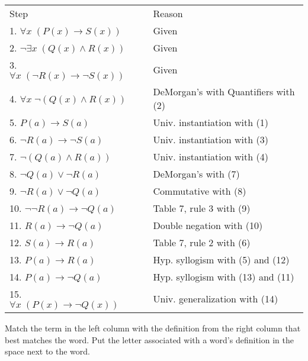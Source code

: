 \documentclass[12pt,addpoints]{exam}
\newcommand{\ra}{\rightarrow}
\begin{document}
\begin{questions}
\begin{solution}
    \begin{tabular}{lll}
            Step                    & \hspace{0.15in} & Reason \\
            1. $\forall x\; (P(x) \ra S(x))$            & & Given \\
            2. $\neg \exists x\; (Q(x) \wedge R(x))$    & & Given \\
            3. $\forall x\; (\neg R(x) \ra \neg S(x))$  & & Given \\
            4. $\forall x\; \neg (Q(x) \wedge R(x))$    & & DeMorgan's with Quantifiers with (2) \\
            5. $P(a) \ra S(a)$                          & & Univ. instantiation with (1) \\
            6. $\neg R(a) \ra \neg S(a)$                & & Univ. instantiation with (3) \\
            7. $\neg (Q(a) \wedge R(a))$                & & Univ. instantiation with (4) \\
            8. $\neg Q(a) \vee \neg R(a)$               & & DeMorgan's with (7) \\
            9. $\neg R(a) \vee \neg Q(a)$               & & Commutative with (8) \\
            10. $\neg \neg R(a) \ra \neg Q(a)$          & & Table 7, rule 3 with (9) \\
            11. $R(a) \ra \neg Q(a)$                    & & Double negation with (10) \\
            12. $S(a) \ra R(a)$                         & & Table 7, rule 2 with (6) \\
            13. $P(a) \ra R(a)$                         & & Hyp. syllogism with (5) and (12) \\
            14. $P(a) \ra \neg Q(a)$                    & & Hyp. syllogism with (13) and (11) \\
            15. $\forall x\; (P(x) \ra \neg Q(x))$      & & Univ. generalization with (14)
    \end{tabular}
\end{solution}


\question  Match the term in the left column with the definition
from the right column that best matches the word.  Put the letter
associated with a word's definition in the space next to the word.


\end{questions}
\end{document}
